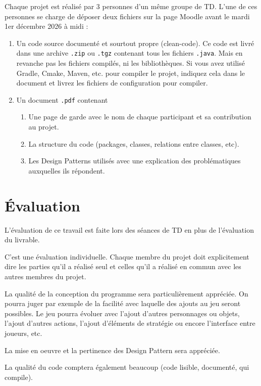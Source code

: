 \documentclass{article}
\begin{document}
Chaque projet est réalisé par 3 personnes d'un même groupe de TD. L’une de ces personnes se charge de déposer deux fichiers sur la
page Moodle avant le mardi 1er décembre 2026 à midi :

\begin{enumerate}
    \item Un code source documenté et sourtout propre (clean-code). Ce code est livré dans une archive \texttt{.zip} 
    ou \texttt{.tgz} contenant tous les fichiers \texttt{.java}. 
    Mais en revanche pas les fichiers compilés, ni les bibliothèques.
    Si vous avez utilisé Gradle, Cmake, Maven, etc. pour compiler le projet, indiquez cela dans le document 
    et livrez les fichiers de configuration pour compiler.

    \item Un document \texttt{.pdf} contenant
\begin{enumerate}
\item Une page de garde avec le nom de chaque participant et sa contribution au projet.
\item La structure du code (packages, classes, relations entre classes, etc).
\item Les Design Patterns utilisés avec une explication des problématiques auxquelles ils
répondent.
\end{enumerate}


\end{enumerate}

\section*{Évaluation}

L'évaluation de ce travail est faite lors des séances de TD en plus de l'évaluation du livrable. 

C'est une évaluation individuelle. Chaque membre du projet doit explicitement dire les parties qu'il a
réalisé seul et celles qu'il a réalisé en commun avec les autres membres du projet.

La qualité de la conception du programme sera particulièrement appréciée. On pourra juger par exemple de la facilité avec 
laquelle des ajouts au jeu seront possibles. Le jeu pourra évoluer avec l’ajout d’autres personnages ou objets, l’ajout 
d’autres actions, l’ajout d’éléments de stratégie ou encore l’interface entre joueurs, etc.

La mise en oeuvre et la pertinence des Design Pattern sera appréciée.

La qualité du code comptera également beaucoup (code lisible, documenté, qui compile).
\end{document}
